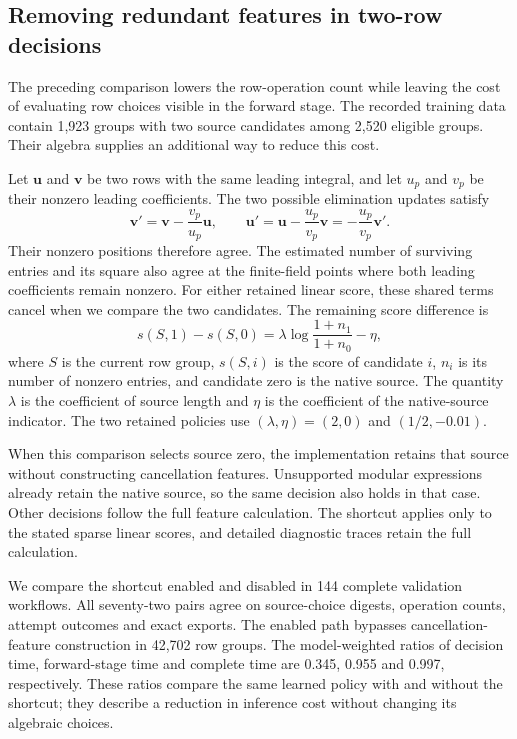 \clearpage
\subsection{Removing redundant features in two-row decisions}
The preceding comparison lowers the row-operation count while leaving the
cost of evaluating row choices visible in the forward stage. The recorded
training data contain 1,923 groups with two source candidates among 2,520
eligible groups. Their algebra supplies an additional way to reduce this cost.

Let $\boldsymbol u$ and $\boldsymbol v$ be two rows with the same leading
integral, and let $u_p$ and $v_p$ be their nonzero leading coefficients.
The two possible elimination updates satisfy
\[
 \boldsymbol v'=\boldsymbol v-\frac{v_p}{u_p}\boldsymbol u,
 \qquad
 \boldsymbol u'=\boldsymbol u-\frac{u_p}{v_p}\boldsymbol v
              =-\frac{u_p}{v_p}\boldsymbol v'.
\]
Their nonzero positions therefore agree. The estimated number of surviving
entries and its square also agree at the finite-field points where both
leading coefficients remain nonzero. For either retained linear score, these
shared terms cancel when we compare the two candidates. The remaining
score difference is
\[
 s(S,1)-s(S,0)=
 \lambda\log\frac{1+n_1}{1+n_0}-\eta,
\]
where $S$ is the current row group, $s(S,i)$ is the score of candidate $i$,
$n_i$ is its number of nonzero entries, and candidate zero is the native
source. The quantity $\lambda$ is the coefficient of source length and $\eta$ is the
coefficient of the native-source indicator. The two retained policies use
$(\lambda,\eta)=(2,0)$ and $(1/2,-0.01)$.

When this comparison selects source zero, the implementation retains that
source without constructing cancellation features. Unsupported modular
expressions already retain the native source, so the same decision also
holds in that case. Other decisions follow the full feature calculation.
The shortcut applies only to the stated sparse linear scores, and detailed
diagnostic traces retain the full calculation.

We compare the shortcut enabled and disabled in 144 complete validation
workflows. All seventy-two pairs agree on source-choice digests, operation
counts, attempt outcomes and exact exports. The enabled path bypasses
cancellation-feature construction in 42,702 row groups. The model-weighted
ratios of decision time, forward-stage time and complete time are
0.345, 0.955 and 0.997, respectively. These ratios compare the same learned policy with and without the shortcut; they describe a reduction in inference cost without changing its algebraic choices.

